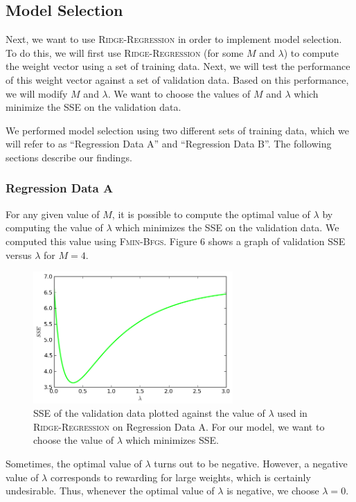 \documentclass{sigchi}
\begin{document}
\subsection{Model Selection}

Next, we want to use \textsc{Ridge-Regression} in order to implement model selection. To do this, we will first use \textsc{Ridge-Regression}  (for some $M$ and $\lambda$) to compute the weight vector using a set of training data. Next, we will test the performance of this weight vector against a set of validation data. Based on this performance, we will modify $M$ and $\lambda$. We want to choose the values of $M$ and $\lambda$ which minimize the SSE on the validation data.

We performed model selection using two different sets of training data, which we will refer to as ``Regression Data A'' and ``Regression Data B''. The following sections describe our findings.

\subsubsection{Regression Data A}

For any given value of $M$, it is possible to compute the optimal value of $\lambda$ by computing the value of $\lambda$ which minimizes the SSE on the validation data. We computed this value using \textsc{Fmin-Bfgs}. Figure 6 shows a graph of validation SSE versus $\lambda$ for $M = 4$.

\begin{figure}[!t]
\centering
\includegraphics[width=3in]{min_lam.png}
\caption{SSE of the validation data plotted against the value of $\lambda$ used in \textsc{Ridge-Regression} on Regression Data A. For our model, we want to choose the value of $\lambda$ which minimizes SSE.}
\end{figure}

Sometimes, the optimal value of $\lambda$ turns out to be negative. However, a negative value of $\lambda$ corresponds to rewarding for large weights, which is certainly undesirable. Thus, whenever the optimal value of $\lambda$ is negative, we choose $\lambda = 0$.
\end{document}
